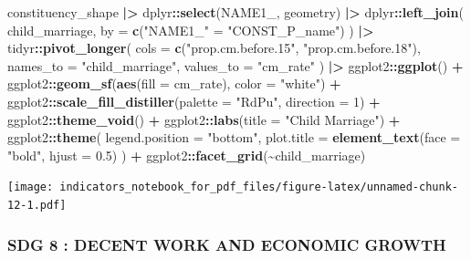 \documentclass[
]{article}
\newenvironment{Shaded}{\begin{snugshade}}{\end{snugshade}}
\newcommand{\AttributeTok}[1]{\textcolor[rgb]{0.13,0.29,0.53}{#1}}
\newcommand{\DecValTok}[1]{\textcolor[rgb]{0.00,0.00,0.81}{#1}}
\newcommand{\FloatTok}[1]{\textcolor[rgb]{0.00,0.00,0.81}{#1}}
\newcommand{\FunctionTok}[1]{\textcolor[rgb]{0.13,0.29,0.53}{\textbf{#1}}}
\newcommand{\NormalTok}[1]{#1}
\newcommand{\OtherTok}[1]{\textcolor[rgb]{0.56,0.35,0.01}{#1}}
\newcommand{\SpecialCharTok}[1]{\textcolor[rgb]{0.81,0.36,0.00}{\textbf{#1}}}
\newcommand{\StringTok}[1]{\textcolor[rgb]{0.31,0.60,0.02}{#1}}
\newenvironment{UNFPAShadedBox}{%
\begin{tcolorbox}[sharp corners, enhanced, colback=white, boxrule=0pt, borderline west={2pt}{0pt}{orange}]%
}{\end{tcolorbox}}
\newenvironment{Highlighting}{\begin{UNFPAShadedBox}}{\end{UNFPAShadedBox}}
\begin{document}
\begin{Shaded}
\begin{Highlighting}[]
\NormalTok{constituency\_shape }\SpecialCharTok{|\textgreater{}}
\NormalTok{  dplyr}\SpecialCharTok{::}\FunctionTok{select}\NormalTok{(NAME1\_, geometry) }\SpecialCharTok{|\textgreater{}}
\NormalTok{  dplyr}\SpecialCharTok{::}\FunctionTok{left\_join}\NormalTok{(}
\NormalTok{    child\_marriage,}
    \AttributeTok{by =} \FunctionTok{c}\NormalTok{(}\StringTok{"NAME1\_"} \OtherTok{=} \StringTok{"CONST\_P\_name"}\NormalTok{)}
\NormalTok{  ) }\SpecialCharTok{|\textgreater{}}
\NormalTok{  tidyr}\SpecialCharTok{::}\FunctionTok{pivot\_longer}\NormalTok{(}
    \AttributeTok{cols =} \FunctionTok{c}\NormalTok{(}\StringTok{"prop.cm.before.15"}\NormalTok{, }\StringTok{"prop.cm.before.18"}\NormalTok{),}
    \AttributeTok{names\_to =} \StringTok{"child\_marriage"}\NormalTok{,}
    \AttributeTok{values\_to =} \StringTok{"cm\_rate"}
\NormalTok{  ) }\SpecialCharTok{|\textgreater{}}
\NormalTok{  ggplot2}\SpecialCharTok{::}\FunctionTok{ggplot}\NormalTok{() }\SpecialCharTok{+}
\NormalTok{  ggplot2}\SpecialCharTok{::}\FunctionTok{geom\_sf}\NormalTok{(}\FunctionTok{aes}\NormalTok{(}\AttributeTok{fill =}\NormalTok{ cm\_rate), }\AttributeTok{color =} \StringTok{"white"}\NormalTok{) }\SpecialCharTok{+}
\NormalTok{  ggplot2}\SpecialCharTok{::}\FunctionTok{scale\_fill\_distiller}\NormalTok{(}\AttributeTok{palette =} \StringTok{"RdPu"}\NormalTok{, }\AttributeTok{direction =} \DecValTok{1}\NormalTok{) }\SpecialCharTok{+}
\NormalTok{  ggplot2}\SpecialCharTok{::}\FunctionTok{theme\_void}\NormalTok{() }\SpecialCharTok{+}
\NormalTok{  ggplot2}\SpecialCharTok{::}\FunctionTok{labs}\NormalTok{(}\AttributeTok{title =} \StringTok{"Child Marriage"}\NormalTok{) }\SpecialCharTok{+}
\NormalTok{  ggplot2}\SpecialCharTok{::}\FunctionTok{theme}\NormalTok{(}
    \AttributeTok{legend.position =} \StringTok{"bottom"}\NormalTok{,}
    \AttributeTok{plot.title =} \FunctionTok{element\_text}\NormalTok{(}\AttributeTok{face =} \StringTok{"bold"}\NormalTok{, }\AttributeTok{hjust =} \FloatTok{0.5}\NormalTok{)}
\NormalTok{  ) }\SpecialCharTok{+}
\NormalTok{  ggplot2}\SpecialCharTok{::}\FunctionTok{facet\_grid}\NormalTok{(}\SpecialCharTok{\textasciitilde{}}\NormalTok{child\_marriage)}
\end{Highlighting}
\end{Shaded}

\texttt{[image: indicators\_notebook\_for\_pdf\_files/figure-latex/unnamed-chunk-12-1.pdf]}

\subsubsection{SDG 8 : DECENT WORK AND ECONOMIC
GROWTH}\label{sdg-8-decent-work-and-economic-growth}
\end{document}
